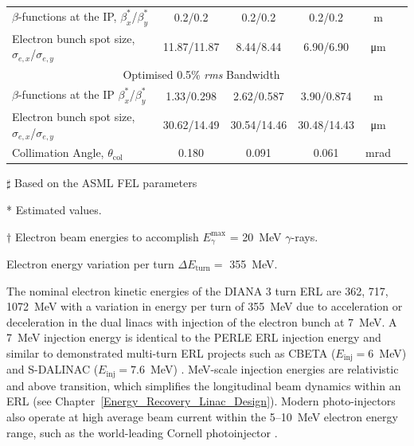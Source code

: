\documentclass[../main.tex]{subfiles}
\begin{document}
\begin{table}[!h]
\begin{threeparttable}
{\begin{tabular}{lccccc}
\hline
$\beta$-functions at the IP, $\beta_{x}^{*}$/$\beta_{y}^{*}$ & 0.2/0.2 & 0.2/0.2 & 0.2/0.2 & \si{\meter} \\
Electron bunch spot size, $\sigma_{e,x}$/$\sigma_{e,y}$ & 11.87/11.87 & 8.44/8.44 & 6.90/6.90 & \si{\micro\meter}\\
\hline\multicolumn{5}{c}{Optimised 0.5\% \textit{rms} Bandwidth} \\
\hline
$\beta$-functions at the IP $\beta_{x}^{*}$/$\beta_{y}^{*}$ & 1.33/0.298 & 2.62/0.587 & 3.90/0.874 & \si{\meter} \\
Electron bunch spot size, $\sigma_{e,x}$/$\sigma_{e,y}$ & 30.62/14.49 & 30.54/14.46 & 30.48/14.43 & \si{\micro\meter}\\
Collimation Angle, $\theta_{\mathrm{col}}$ & 0.180 & 0.091 & 0.061 & \si{\milli\radian} \\ 
\hline\hline
\end{tabular}}
\begin{tablenotes}
\item[$\sharp$]{Based on the ASML FEL parameters \cite{akkermans2017compact}}
\item[*]{Estimated values.}
\item[$\dagger$]{Electron beam energies to accomplish $E_{\gamma}^{\mathrm{max}}$ = 20~\si{\mega\electronvolt} $\gamma$-rays.}
\item{Electron energy variation per turn $\Delta E_{\mathrm{turn}} =$ 355~\si{\mega\electronvolt}.}
\end{tablenotes}
\end{threeparttable}
\label{tab:DIANA_electron_beam_design_parameters}
\end{table}

The nominal electron kinetic energies of the DIANA 3 turn ERL are 362, 717, 1072~\si{\mega\electronvolt} with a variation in energy per turn of 355~\si{\mega\electronvolt} due to acceleration or deceleration in the dual linacs with injection of the electron bunch at 7~\si{\mega\electronvolt}. A 7~\si{\mega\electronvolt} injection energy is identical to the PERLE \cite{angal2018perle} ERL injection energy and similar to demonstrated multi-turn ERL projects such as CBETA ($E_{\mathrm{inj}}=6$~\si{\mega\electronvolt}) \cite{bartnik2020cbeta} and S-DALINAC ($E_{\mathrm{inj}}=7.6$~\si{\mega\electronvolt}) \cite{arnold2018first}. \si{\mega\electronvolt}-scale injection energies are relativistic and above transition, which simplifies the longitudinal beam dynamics within an ERL (see Chapter~\ref{Energy_Recovery_Linac_Design}). Modern photo-injectors also operate at high average beam current within the 5--10~\si{\mega\electronvolt} electron energy range, such as the world-leading Cornell photoinjector \cite{bartnik2015operational}. 
\end{document}
